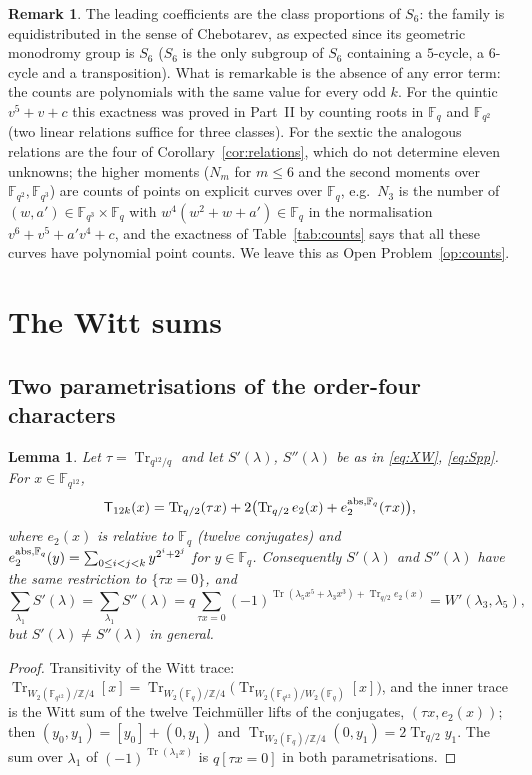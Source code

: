 ﻿\documentclass[12pt,a4paper]{amsart}
\newtheorem{lemma}[theorem]{Lemma}
\theoremstyle{definition}
\newtheorem{remark}[theorem]{Remark}
\newcommand{\F}{\mathbb{F}}
\newcommand{\Z}{\mathbb{Z}}
\newcommand{\Tr}{\operatorname{Tr}}
\newcommand{\Spp}{S''}
\begin{document}
\begin{remark}
The leading coefficients are the class proportions of $S_6$: the family is equidistributed in the sense of Chebotarev, as expected since its geometric monodromy group is $S_6$ ($S_6$ is the only subgroup of $S_6$ containing a $5$-cycle, a $6$-cycle and a transposition). What is remarkable is the absence of any error term: the counts are polynomials with the same value for every odd $k$. For the quintic $v^5+v+c$ this exactness was proved in Part~II by counting roots in $\F_q$ and $\F_{q^2}$ (two linear relations suffice for three classes). For the sextic the analogous relations are the four of Corollary~\ref{cor:relations}, which do not determine eleven unknowns; the higher moments ($N_m$ for $m\le6$ and the second moments over $\F_{q^2},\F_{q^3}$) are counts of points on explicit curves over $\F_q$, e.g.\ $N_3$ is the number of $(w,a')\in\F_{q^3}\times\F_q$ with $w^4(w^2+w+a')\in\F_q$ in the normalisation $v^6+v^5+a'v^4+c$, and the exactness of Table~\ref{tab:counts} says that all these curves have polynomial point counts. We leave this as Open Problem~\ref{op:counts}.
\end{remark}

\section{The Witt sums}\label{sec:witt}

\subsection{Two parametrisations of the order-four characters}
\begin{lemma}\label{lem:SpSpp}
Let $\tau=\Tr_{q^{12}/q}$ and let $S'(\lambda)$, $\Spp(\lambda)$ be as in \eqref{eq:XW}, \eqref{eq:Spp}. For $x\in\F_{q^{12}}$,
\[
\mathsf T_{12k}(x)=\Tr_{q/2}(\tau x)+2\bigl(\Tr_{q/2}e_2(x)+e_2^{{\rm abs},\F_q}(\tau x)\bigr),
\]
where $e_2(x)$ is relative to $\F_q$ (twelve conjugates) and $e_2^{{\rm abs},\F_q}(y)=\sum_{0\le i<j<k}y^{2^i+2^j}$ for $y\in\F_q$. Consequently $S'(\lambda)$ and $\Spp(\lambda)$ have the same restriction to $\{\tau x=0\}$, and
\[
\sum_{\lambda_1}S'(\lambda)=\sum_{\lambda_1}\Spp(\lambda)=q\sum_{\tau x=0}(-1)^{\Tr(\lambda_5x^5+\lambda_3x^3)+\Tr_{q/2}e_2(x)}=W'(\lambda_3,\lambda_5),
\]
but $S'(\lambda)\ne\Spp(\lambda)$ in general.
\end{lemma}
\begin{proof}
Transitivity of the Witt trace: $\Tr_{W_2(\F_{q^{12}})/\Z/4}[x]=\Tr_{W_2(\F_q)/\Z/4}\bigl(\Tr_{W_2(\F_{q^{12}})/W_2(\F_q)}[x]\bigr)$, and the inner trace is the Witt sum of the twelve Teichm\"uller lifts of the conjugates, $(\tau x,e_2(x))$; then $(y_0,y_1)=[y_0]+(0,y_1)$ and $\Tr_{W_2(\F_q)/\Z/4}(0,y_1)=2\Tr_{q/2}y_1$. The sum over $\lambda_1$ of $(-1)^{\Tr(\lambda_1x)}$ is $q[\tau x=0]$ in both parametrisations.
\end{proof}
\end{document}
